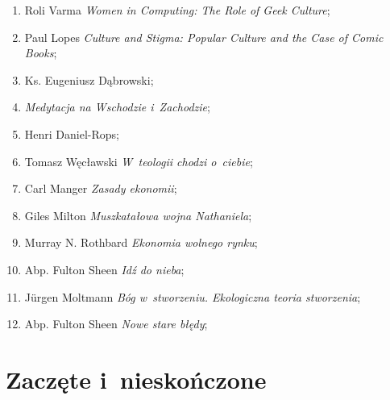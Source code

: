 \documentclass[a4paper,11pt]{article}
\begin{document}
\begin{enumerate}
\item Roli Varma \textit{Women in Computing: The Role of Geek Culture};



\item Paul Lopes \textit{Culture and Stigma: Popular Culture and the Case
    of Comic Books};



\item Ks. Eugeniusz Dąbrowski;



\item \textit{Medytacja na Wschodzie i~Zachodzie};



\item Henri Daniel-Rops;



\item Tomasz Węcławski \textit{W~teologii chodzi o~ciebie};



\item Carl Manger \textit{Zasady ekonomii};



\item Giles Milton \textit{Muszkatałowa wojna Nathaniela};



\item Murray N. Rothbard \textit{Ekonomia wolnego rynku};



\item Abp. Fulton Sheen \textit{Idź do nieba};



\item J\"{u}rgen Moltmann \textit{Bóg w~stworzeniu. Ekologiczna teoria
    stworzenia};



\item Abp. Fulton Sheen \textit{Nowe stare błędy};

\end{enumerate}










\newpage
\section{Zaczęte i~nieskończone}
\end{document}
